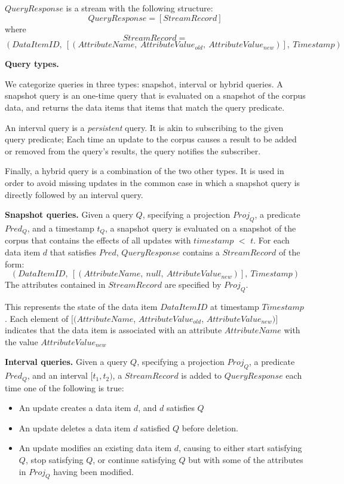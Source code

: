 \noindent
$QueryResponse$ is a stream with the following structure:
\[
  QueryResponse = [StreamRecord]
\]
where
\[
  StreamRecord =
\]
\[
  (DataItemID,~[(AttributeName,~AttributeValue_{old},~AttributeValue_{new})],~Timestamp)
\]


\bigskip
\noindent
\textbf{Query types.}

\noindent
We categorize queries in three types: snapshot, interval or hybrid queries.
A snapshot query is an one-time query that is evaluated on a snapshot of the corpus data,
and returns the data items that items that match the query predicate.

An interval query is a \textit{persistent} query.
It is akin to subscribing to the given query predicate;
Each time an update to the corpus causes a result to be added or removed from the query's results,
the query notifies the subscriber.

Finally, a hybrid query is a combination of the two other types.
It is used in order to avoid missing updates in the common case in which a snapshot query is
directly followed by an interval query.

\medskip
\noindent
\textbf{Snapshot queries.}
Given a query $Q$,
specifying a projection $Proj_Q$, a predicate $Pred_Q$, and a timestamp $t_Q$,
a snapshot query is evaluated on a snapshot of the corpus that contains the effects of all updates with
$timestamp$ $<$ $t$.
For each data item $d$ that satisfies $Pred$, $QueryResponse$ contains a $StreamRecord$ of the form:
\[
(DataItemID,~[(AttributeName,~null,~AttributeValue_{new})],~Timestamp)
\]
The attributes contained in $StreamRecord$ are specified by $Proj_Q$.

This represents the state of the data item $DataItemID$ at timestamp $Timestamp$.
Each element of $[(AttributeName$, $AttributeValue_{old}$, $AttributeValue_{new})]$ indicates that
the data item is associated with an attribute $AttributeName$ with the value $AttributeValue_{new}$

\medskip
\noindent
\textbf{Interval queries.}
Given a query $Q$,
specifying a projection $Proj_Q$, a predicate $Pred_Q$, and an interval $[t_1, t_2)$,
a $StreamRecord$ is added to $QueryResponse$ each time one of the following is true:
\begin{itemize}
\item An update creates a data item $d$, and $d$ satisfies $Q$

\item An update deletes a data item $d$ satisfied $Q$ before deletion.

\item An update modifies an existing data item $d$,
causing to either start satisfying $Q$, stop satisfying $Q$,
or continue satisfying $Q$ but with some of the attributes in $Proj_Q$ having been modified.
\end{itemize}

